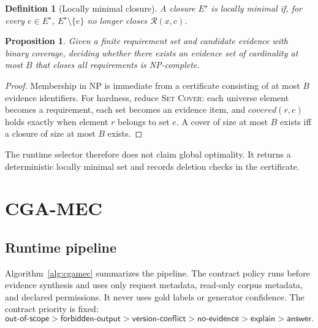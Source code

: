 \documentclass[11pt]{article}
\newtheorem{definition}{Definition}
\newtheorem{proposition}{Proposition}
\newcommand{\method}{CGA-MEC}
\begin{document}
\begin{definition}[Locally minimal closure]\label{def:minimal}
A closure $E^\star$ is locally minimal if, for every $e\in E^\star$, $E^\star\setminus\{e\}$ no longer closes $\mathcal{R}(x,c)$.
\end{definition}

\begin{proposition}\label{prop:np-hard}
Given a finite requirement set and candidate evidence with binary coverage, deciding whether there exists an evidence set of cardinality at most $B$ that closes all requirements is NP-complete.
\end{proposition}

\begin{proof}
Membership in NP is immediate from a certificate consisting of at most $B$ evidence identifiers. For hardness, reduce \textsc{Set Cover}: each universe element becomes a requirement, each set becomes an evidence item, and $\mathit{covered}(r,e)$ holds exactly when element $r$ belongs to set $e$. A cover of size at most $B$ exists iff a closure of size at most $B$ exists.
\end{proof}

The runtime selector therefore does not claim global optimality. It returns a deterministic locally minimal set and records deletion checks in the certificate.

\section{\method{}}
\label{sec:method}

\subsection{Runtime pipeline}

Algorithm~\ref{alg:cgamec} summarizes the pipeline. The contract policy runs before evidence synthesis and uses only request metadata, read-only corpus metadata, and declared permissions. It never uses gold labels or generator confidence. The contract priority is fixed:
\[
\textsf{out-of-scope} >
\textsf{forbidden-output} >
\textsf{version-conflict} >
\textsf{no-evidence} >
\textsf{explain} >
\textsf{answer}.
\]
\end{document}

